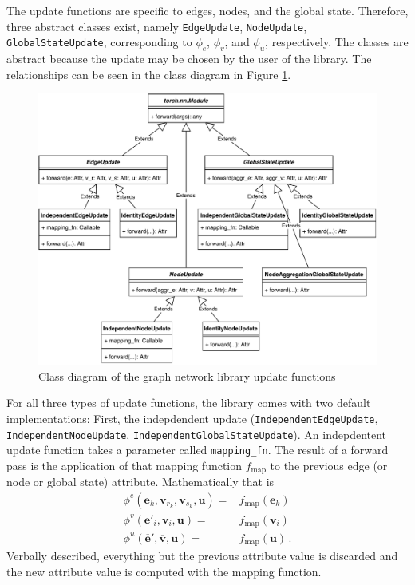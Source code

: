 The update functions are specific to edges, nodes, and the global state. Therefore, three abstract classes exist, namely \texttt{EdgeUpdate}, \texttt{NodeUpdate}, \texttt{GlobalStateUpdate}, corresponding to $\phi_e$, $\phi_v$, and $\phi_u$, respectively. The classes are abstract because the update may be chosen by the user of the library. The relationships can be seen in the class diagram in Figure \ref{fig:classdiagramgnfunctionsupdate}.

\begin{figure}\centering
    \includegraphics[scale=0.65]{resources/graphnets-functions-update}
    \caption{Class diagram of the graph network library update functions}\label{fig:classdiagramgnfunctionsupdate}
\end{figure}

For all three types of update functions, the library comes with two default implementations: First, the indepdendent update (\texttt{IndependentEdgeUpdate}, \texttt{IndependentNodeUpdate}, \texttt{IndependentGlobalStateUpdate}). An indepdentent update function takes a parameter called \texttt{mapping\_fn}. The result of a forward pass is the application of that mapping function $f_\text{map}$ to the previous edge (or node or global state) attribute. Mathematically that is \begin{align}
\phi^e\left(\bm{e}_k,\bm{v}_{r_k},\bm{v}_{s_k},\bm{u}\right)=&f_\text{map}\left(\bm{e}_k\right)\\
\phi^v\left(\bm{\overline{e}}'_i,\bm{v}_i,\bm{u}\right)=&f_\text{map}\left(\bm{v}_i\right)\\
\phi^u\left(\bm{\overline{e}}',\bm{\overline{v}},\bm{u}\right)=&f_\text{map}\left(\bm{u}\right)\,.
\end{align}Verbally described, everything but the previous attribute value is discarded and the new attribute value is computed with the mapping function.


